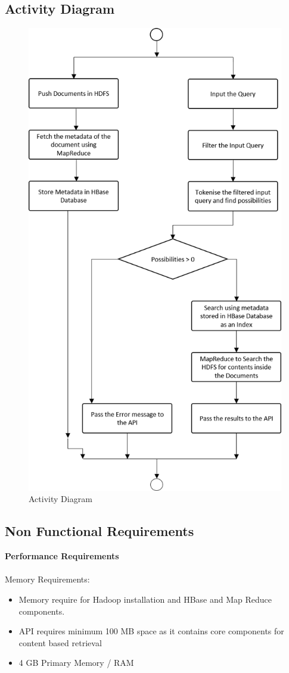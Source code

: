 \documentclass[oneside,a4paper,12pt]{report}
\begin{document}
\subsection{Activity Diagram}
\begin{figure}[H]
\includegraphics{activity_diagram}
\caption{Activity Diagram}
\end{figure}

\subsection{Non Functional Requirements}
\textbf{Performance Requirements} \\ \\
Memory Requirements:
\begin{itemize}	
\item Memory require for Hadoop installation and HBase and Map Reduce components.
\item API requires minimum 100 MB space as it contains core components for content based retrieval
\item 4 GB Primary Memory / RAM
\end{itemize}
\end{document}
